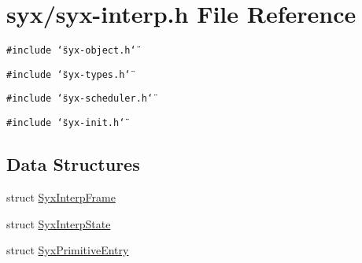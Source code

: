 \hypertarget{syx-interp_8h}{
\section{syx/syx-interp.h File Reference}
\label{syx-interp_8h}
}
{\tt \#include \char`\"{}syx-object.h\char`\"{}}\par
{\tt \#include \char`\"{}syx-types.h\char`\"{}}\par
{\tt \#include \char`\"{}syx-scheduler.h\char`\"{}}\par
{\tt \#include \char`\"{}syx-init.h\char`\"{}}\par
\subsection*{Data Structures}
\begin{CompactItemize}
\item 
struct \hyperlink{struct_syx_interp_frame}{SyxInterpFrame}
\item 
struct \hyperlink{struct_syx_interp_state}{SyxInterpState}
\item 
struct \hyperlink{struct_syx_primitive_entry}{SyxPrimitiveEntry}
\end{CompactItemize}

